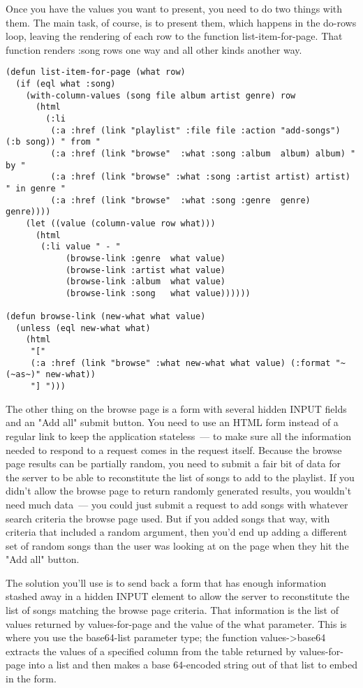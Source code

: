Once you have the values you want to present, you need to do two things with them. The
main task, of course, is to present them, which happens in the do-rows loop, leaving the
rendering of each row to the function list-item-for-page. That function renders :song rows
one way and all other kinds another way.

\begin{lstlisting}
(defun list-item-for-page (what row)
  (if (eql what :song)
    (with-column-values (song file album artist genre) row
      (html
        (:li
         (:a :href (link "playlist" :file file :action "add-songs") (:b song)) " from "
         (:a :href (link "browse"  :what :song :album  album) album) " by "
         (:a :href (link "browse" :what :song :artist artist) artist) " in genre "
         (:a :href (link "browse"  :what :song :genre  genre) genre))))
    (let ((value (column-value row what)))
      (html
       (:li value " - "
            (browse-link :genre  what value)
            (browse-link :artist what value)
            (browse-link :album  what value)
            (browse-link :song   what value))))))

(defun browse-link (new-what what value)
  (unless (eql new-what what)
    (html
     "[" 
     (:a :href (link "browse" :what new-what what value) (:format "~(~as~)" new-what))
     "] ")))
\end{lstlisting}

The other thing on the browse page is a form with several hidden INPUT fields and an "Add
all" submit button. You need to use an HTML form instead of a regular link to keep the
application stateless~--- to make sure all the information needed to respond to a request
comes in the request itself. Because the browse page results can be partially random, you
need to submit a fair bit of data for the server to be able to reconstitute the list of
songs to add to the playlist. If you didn't allow the browse page to return randomly
generated results, you wouldn't need much data~--- you could just submit a request to add
songs with whatever search criteria the browse page used. But if you added songs that way,
with criteria that included a random argument, then you'd end up adding a different set of
random songs than the user was looking at on the page when they hit the "Add all" button.

The solution you'll use is to send back a form that has enough information stashed away in
a hidden INPUT element to allow the server to reconstitute the list of songs matching the
browse page criteria. That information is the list of values returned by values-for-page
and the value of the what parameter. This is where you use the base64-list parameter type;
the function values->base64 extracts the values of a specified column from the table
returned by values-for-page into a list and then makes a base 64-encoded string out of
that list to embed in the form.


